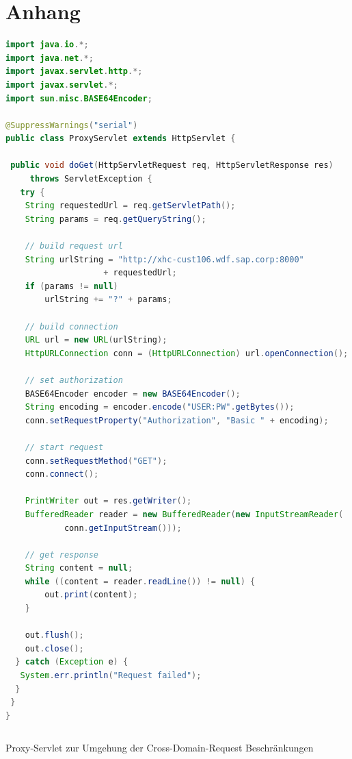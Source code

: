 \seAppendix{}

\setcounter{page}{8}


\chapter{Anhang}

\begin{lstlisting}[language=Java]
import java.io.*;
import java.net.*;
import javax.servlet.http.*;
import javax.servlet.*;
import sun.misc.BASE64Encoder;

@SuppressWarnings("serial")
public class ProxyServlet extends HttpServlet {

 public void doGet(HttpServletRequest req, HttpServletResponse res)
     throws ServletException {
   try {
    String requestedUrl = req.getServletPath();
	String params = req.getQueryString();

	// build request url
	String urlString = "http://xhc-cust106.wdf.sap.corp:8000"
					+ requestedUrl;
	if (params != null)
		urlString += "?" + params;

	// build connection
	URL url = new URL(urlString);
	HttpURLConnection conn = (HttpURLConnection) url.openConnection();

	// set authorization
	BASE64Encoder encoder = new BASE64Encoder();
	String encoding = encoder.encode("USER:PW".getBytes());
	conn.setRequestProperty("Authorization", "Basic " + encoding);

	// start request
	conn.setRequestMethod("GET");
	conn.connect();

	PrintWriter out = res.getWriter();
	BufferedReader reader = new BufferedReader(new InputStreamReader(
			conn.getInputStream()));

	// get response
	String content = null;
	while ((content = reader.readLine()) != null) {
		out.print(content);
	}

	out.flush();
	out.close();
  } catch (Exception e) {
   System.err.println("Request failed");
  }
 }
}
\end{lstlisting}

\begin{programm}[htbp]
\begin{lstlisting}
\end{lstlisting}
\caption{Proxy-Servlet zur Umgehung der Cross-Domain-Request Beschränkungen\label{listing:servlet}}
\end{programm}

